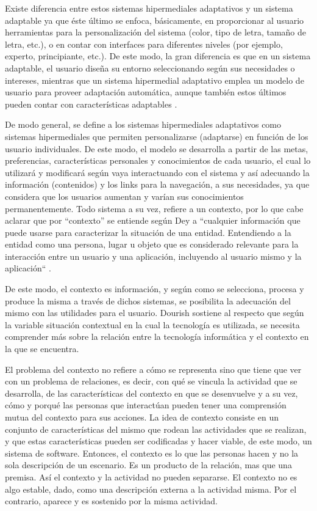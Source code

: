 Existe diferencia entre estos sistemas hipermediales adaptativos y un
sistema adaptable ya que éste último se enfoca, básicamente, en proporcionar
al usuario herramientas para la personalización del sistema (color, tipo de
letra, tamaño de letra, etc.), o en contar con interfaces para diferentes
niveles (por ejemplo, experto, principiante, etc.). De este modo, la gran
diferencia es que en un sistema adaptable, el usuario diseña su entorno
seleccionando según sus necesidades o intereses, mientras que un sistema
hipermedial adaptativo emplea un modelo de usuario para proveer adaptación
automática, aunque también estos últimos pueden contar con características
adaptables \cite{lxxviii}.

De modo general, se define a los sistemas hipermediales adaptativos
como sistemas hipermediales que permiten personalizarse (adaptarse) en
función de los usuario individuales. De este modo, el modelo se desarrolla a
partir de las metas, preferencias, características personales y conocimientos de
cada usuario, el cual lo utilizará y modificará según vaya interactuando con el
sistema y así adecuando la información (contenidos) y los links para la
navegación, a sus necesidades, ya que considera que los usuarios aumentan y
varían sus conocimientos permanentemente. Todo sistema a su vez, refiere a un
contexto, por lo que cabe aclarar que por “contexto” se entiende según Dey
a ``cualquier información que puede usarse para caracterizar la situación de
una entidad. Entendiendo a la entidad como una persona, lugar u objeto
que es considerado relevante para la interacción entre un usuario y una
aplicación, incluyendo al usuario mismo y la aplicación`` \cite{lxxix}.

De este modo, el contexto es información, y según como se selecciona, procesa y
produce la misma a través de dichos sistemas, se posibilita la adecuación del
mismo con las utilidades para el usuario. Dourish \cite{.........} sostiene al respecto que según
la variable situación contextual en la cual la tecnología es utilizada, se
necesita comprender más sobre la relación entre la tecnología informática y el
contexto en la que se encuentra.

El problema del contexto no refiere a cómo se representa sino que tiene
que ver con un problema de relaciones, es decir, con qué se vincula la
actividad que se desarrolla, de las características del contexto en que se
desenvuelve y a su vez, cómo y porqué las personas que interactúan pueden
tener una comprensión mutua del contexto para sus acciones. La idea de
contexto consiste en un conjunto de características del mismo que rodean las
actividades que se realizan, y que estas características pueden ser codificadas
y hacer viable, de este modo, un sistema de software. Entonces, el contexto es lo que las personas
hacen y no la sola descripción de un escenario. Es un producto de la relación, mas que una premisa. Así el contexto y la
actividad no pueden separarse. El contexto no es algo estable, dado, como una
descripción externa a la actividad misma. Por el contrario, aparece y es
sostenido por la misma actividad.

